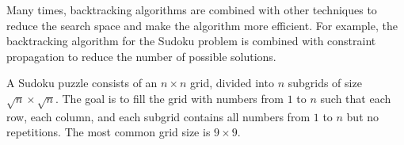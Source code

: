 Many times, backtracking algorithms are combined with other techniques to reduce the
search space and make the algorithm more efficient.  For example, the backtracking
algorithm for the Sudoku problem is combined with constraint propagation to reduce the
number of possible solutions.

A Sudoku puzzle consists of an $n \times n$ grid, divided into $n$ subgrids of size
$\sqrt{n} \times \sqrt{n}$.  The goal is to fill the grid with numbers from $1$ to $n$
such that each row, each column, and each subgrid contains all numbers from $1$ to $n$ but
no repetitions.  The most common grid size is $9 \times 9$.

\begin{figure}
  \centering
  \begin{tikzpicture}


\end{tikzpicture}
\end{figure}
